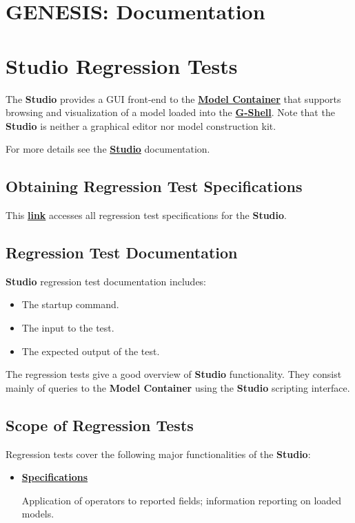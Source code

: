 \documentclass[12pt]{article}
\begin{document}
\section*{GENESIS: Documentation}

\section*{Studio Regression Tests}

The {\bf Studio} provides a GUI front-end to the \href{../model-container/model-container.tex}{\bf Model Container} that supports browsing and visualization of a model loaded into the \href{../gshell/gshell.tex}{\bf G-Shell}. Note that the {\bf Studio} is neither a graphical editor nor model construction kit.

For more details see the \href{../studio/studio.tex}{\bf Studio} documentation.

\subsection*{Obtaining Regression Test Specifications}

This \href{http://www.neurospaces.org/neurospaces_project/studio/tests/html/index.html}{\bf link} accesses all regression test specifications for the {\bf Studio}.

\subsection*{Regression Test Documentation}

{\bf Studio} regression test documentation includes:
\begin{itemize}
\item The startup command.
\item The input to the test.
\item The expected output of the test.
\end{itemize}
The regression tests give a good overview of {\bf Studio} functionality. They consist mainly of queries to the {\bf Model Container} using the {\bf Studio} scripting interface.

\subsection*{Scope of Regression Tests}

Regression tests cover the following major functionalities of the {\bf Studio}:
\begin{itemize}

\item[]\href{http://www.neurospaces.org/neurospaces_project/studio/tests/html/specifications/main.html}{\bf Specifications}

Application of operators to reported fields; information reporting on loaded models.

\end{itemize}
\end{document}
